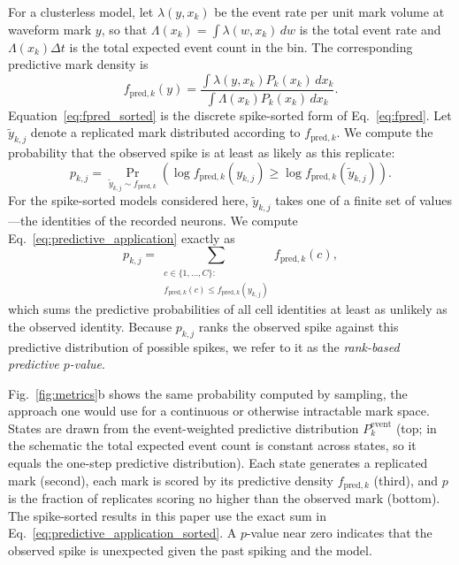 \documentclass[12pt]{article}
\begin{document}
For a clusterless model, let $\lambda(y,x_k)$ be the event rate per unit mark volume at waveform mark $y$, so that $\Lambda(x_k)=\int \lambda(w,x_k)\,dw$ is the total event rate and $\Lambda(x_k)\Delta t$ is the total expected event count in the bin. The corresponding predictive mark density is
\begin{equation}
    \label{eq:fpred}
    f_{\mathrm{pred},k}(y)
    = \frac{\int \lambda(y,x_k)P_k(x_k)\,dx_k}
    {\int \Lambda(x_k)P_k(x_k)\,dx_k}.
\end{equation}
Equation~\eqref{eq:fpred_sorted} is the discrete spike-sorted form of Eq.~\eqref{eq:fpred}. Let $\widetilde{y}_{k,j}$ denote a replicated mark distributed according to $f_{\mathrm{pred},k}$. We compute the probability that the observed spike is at least as likely as this replicate:
\begin{equation}
    \label{eq:predictive_application}
    p_{k,j} = \Pr_{\widetilde{y}_{k,j} \sim f_{\mathrm{pred},k}}\!\left( \log f_{\mathrm{pred},k}(y_{k,j}) \geq \log f_{\mathrm{pred},k}(\widetilde{y}_{k,j}) \right).
\end{equation}
For the spike-sorted models considered here, $\widetilde{y}_{k,j}$ takes one of a finite set of values---the identities of the recorded neurons. We compute Eq.~\eqref{eq:predictive_application} exactly as
\begin{equation}
    \label{eq:predictive_application_sorted}
    p_{k,j}
    = \sum_{\substack{c \in \{1,\ldots,C\}:\\
        f_{\mathrm{pred},k}(c) \leq f_{\mathrm{pred},k}(y_{k,j})}}
        f_{\mathrm{pred},k}(c),
\end{equation}
which sums the predictive probabilities of all cell identities at least as unlikely as the observed identity. Because $p_{k,j}$ ranks the observed spike against this predictive distribution of possible spikes, we refer to it as the \emph{rank-based predictive $p$-value}.

Fig.~\ref{fig:metrics}b shows the same probability computed by sampling, the approach one would use for a continuous or otherwise intractable mark space. States are drawn from the event-weighted predictive distribution $P_k^{\mathrm{event}}$ (top; in the schematic the total expected event count is constant across states, so it equals the one-step predictive distribution). Each state generates a replicated mark (second), each mark is scored by its predictive density $f_{\mathrm{pred},k}$ (third), and $p$ is the fraction of replicates scoring no higher than the observed mark (bottom). The spike-sorted results in this paper use the exact sum in Eq.~\eqref{eq:predictive_application_sorted}. A $p$-value near zero indicates that the observed spike is unexpected given the past spiking and the model.
\end{document}
